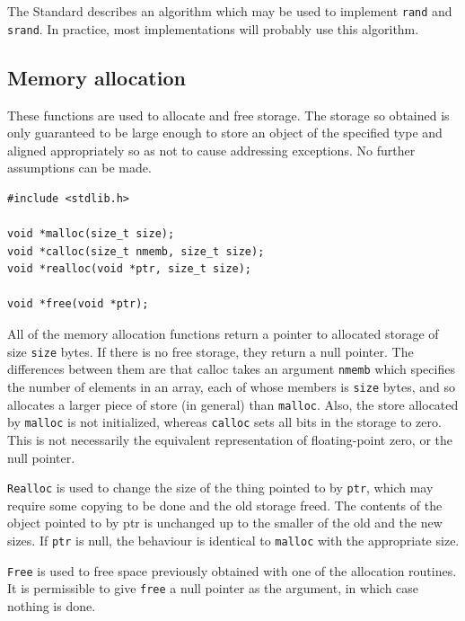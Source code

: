    The Standard describes an algorithm which  may  be  used  to implement
    \texttt{rand} and \texttt{srand}.  In practice, most
    implementations will probably use this algorithm.


  

  \subsection{Memory allocation}
   

   These functions are used to allocate and free storage.  The storage so
    obtained is only guaranteed to be large enough to store an object of the
    specified type and aligned appropriately so as not to cause addressing
    exceptions.  No further assumptions can be made.


   \begin{Verbatim}
#include <stdlib.h>

void *malloc(size_t size);
void *calloc(size_t nmemb, size_t size);
void *realloc(void *ptr, size_t size);

void *free(void *ptr);
\end{Verbatim}

   All of the memory allocation functions return a  pointer  to allocated
    storage  of size \texttt{size} bytes.  If there is no free storage,
    they  return  a  null  pointer.   The  differences between  them  are that
    calloc takes an argument \texttt{nmemb} which specifies the number of
    elements in an array, each of  whose members  is  \texttt{size}  bytes,
    and so allocates a larger piece of store (in general) than
    \texttt{malloc}.  Also, the  store  allocated by  \texttt{malloc}
    is not initialized, whereas \texttt{calloc} sets all bits in the
    storage  to  zero.   This  is  not  necessarily  the equivalent
    representation  of  floating-point  zero, or the null pointer.


   \texttt{Realloc} is used to change the size of the thing  pointed  to
    by  \texttt{ptr},  which  may require some copying to be done and the
    old storage freed.  The contents of the object pointed to by ptr  is
    unchanged  up to the smaller of the old and the new sizes.  If
    \texttt{ptr} is null, the behaviour is identical to \texttt{malloc}
    with the appropriate size.


   \texttt{Free} is used to free space previously obtained with  one  of
    the  allocation  routines.  It is permissible to give \texttt{free}
    a null pointer as the argument, in which case nothing is done.


